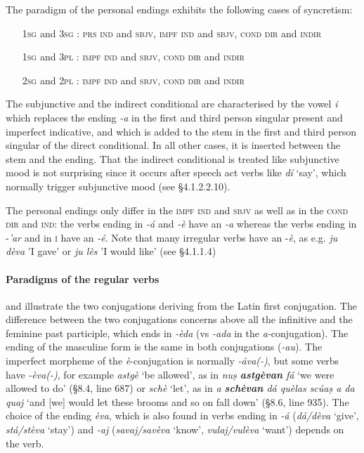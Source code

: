The paradigm of the personal endings  exhibits the following cases of syncretism:

\begin{itemize}
	\item[\textsc{1sg} and \textsc{3sg}]: \textsc{prs} \textsc{ind} and \textsc{sbjv}, \textsc{impf} \textsc{ind} and \textsc{sbjv}, \textsc{cond} \textsc{dir} and \textsc{indir}
\item[\textsc{1sg} and \textsc{3pl}]: \textsc{impf} \textsc{ind} and \textsc{sbjv}, \textsc{cond} \textsc{dir} and \textsc{indir}
\item[\textsc{2sg} and \textsc{2pl}]: \textsc{impf} \textsc{ind} and  \textsc{sbjv}, \textsc{cond} \textsc{dir} and \textsc{indir}
\end{itemize}

The subjunctive and the indirect conditional are characterised by the vowel \textit{i} which replaces the ending\textit{ -a} in the first and third person singular present and imperfect indicative, and which is added to the stem in the first and third person singular of the direct conditional. In all other cases, it is inserted between the stem and the ending. That the indirect conditional is treated like subjunctive mood is not surprising since it occurs after speech act verbs like \textit{dí} `say', which normally trigger subjunctive mood (see §4.1.2.2.10).

The personal endings only differ in the \textsc{impf} \textsc{ind} and \textsc{sbjv} as well as in the \textsc{cond} \textsc{dir} and \textsc{ind}: the verbs ending in \textit{-á} and \textit{-è} have an \textit{-a} whereas the verbs ending in -\textit{'ar} and in \textsc{í} have an \textit{-é}. Note that many irregular verbs have an -\textit{è}, as e.g. \textit{ju dèva} 'I gave' or \textit{ju lès} 'I would like' (see §4.1.1.4)



\paragraph{Paradigms of the regular verbs}
 and  illustrate the two conjugations deriving from the Latin first conjugation. The difference between the two conjugations concerns above all the infinitive and the feminine past participle, which ends in \textit{-èda} (vs \textit{-ada} in the \textit{a-}conjugation). The ending of the masculine form is the same in both conjugations (\textit{-au}). The imperfect morpheme of the \textit{è}-conjugation is normally \textit{-áva(-)}, but some verbs have \textit{-èva(-)}, for example \textit{astgè} `be allowed', as in \textit{nuṣ \textbf{astgèvan} fá} `we were allowed to do' (§8.4, line 687) or \textit{schè} `let', as in \textit{a \textbf{schèvan} dá quèlas scúaṣ a da quaj} `and [we] would let these brooms and so on fall down' (§8.6, line 935). The choice of the ending \textit{èva}, which is also found in verbs ending in \textit{-á} (\textit{dá/dèva} `give', \textit{stá/stèva} `stay') and \textit{-aj} (\textit{savaj/savèva} `know', \textit{vulaj/vulèva} `want') depends on the verb.



